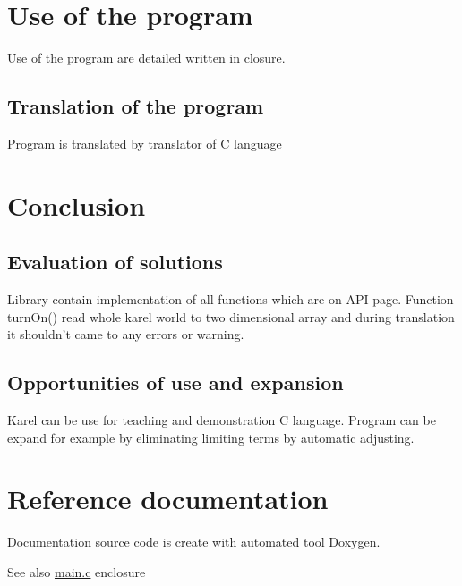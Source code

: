 \hypertarget{index_s_use}{}\section{Use of the program}\label{index_s_use}
Use of the program are detailed written in closure.\hypertarget{index_ss_translation}{}\subsection{Translation of the program}\label{index_ss_translation}
Program is translated by translator of C language\hypertarget{index_s_conclusion}{}\section{Conclusion}\label{index_s_conclusion}
\hypertarget{index_ss_evaluation}{}\subsection{Evaluation of solutions}\label{index_ss_evaluation}
Library contain implementation of all functions which are on API page. Function turnOn() read whole karel world to two dimensional array and during translation it shouldn't came to any errors or warning.\hypertarget{index_ss_oportunities}{}\subsection{Opportunities of use and expansion}\label{index_ss_oportunities}
Karel can be use for teaching and demonstration C language. Program can be expand for example by eliminating limiting terms by automatic adjusting.\hypertarget{index_s_reference}{}\section{Reference documentation}\label{index_s_reference}
Documentation source code is create with automated tool Doxygen. \begin{DoxySeeAlso}{See also}
\hyperlink{main_8c}{main.c} enclosure 
\end{DoxySeeAlso}
